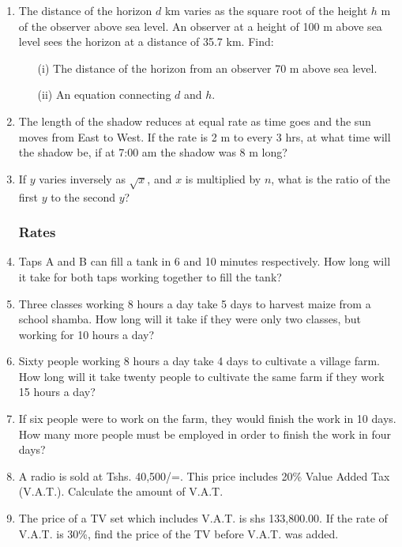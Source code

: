 \begin{enumerate}
	\item The distance of the horizon $d$ km varies as the square root of the height $h$ m of the observer above sea level. An observer at a height of 100 m above sea level sees the horizon at a distance of 35.7 km. Find:
		\begin{itemize}
		
	\item[(i)] The distance of the horizon from an observer 70 m above sea level.
	\item[(ii)] An equation connecting $d$ and $h$.	\end{itemize}
	
	\item The length of the shadow reduces at equal rate as time goes and the sun moves from East to West. If the rate is 2 m to every 3 hrs, at what time will the shadow be, if at 7:00 am the shadow was 8 m long?
	
	\item If $y$ varies inversely as $\sqrt{x}$, and $x$ is multiplied by $n$, what is the ratio of the first $y$ to the second $y$?

		\subsubsection{Rates}
	
	\item Taps A and B can fill a tank in 6 and 10 minutes respectively. How long will it take for both taps working together to fill the tank?
	
	\item Three classes working 8 hours a day take 5 days to harvest maize from a school shamba. How long will it take if they were only two classes, but working for 10 hours a day?
	
	\item Sixty people working 8 hours a day take 4 days to cultivate a village farm. How long will it take twenty people to cultivate the same farm if they work 15 hours a day?
	
	\item If six people were to work on the farm, they would finish the work in 10 days. How many more people must be employed in order to finish the work in four days?
	
	\item A radio is sold at Tshs. 40,500/=. This price includes 20\% Value Added Tax (V.A.T.). Calculate the amount of V.A.T.
	
	\item The price of a TV set which includes V.A.T. is shs 133,800.00. If the rate of V.A.T. is 30\%, find the price of the TV before V.A.T. was added.
	

\end{enumerate}
